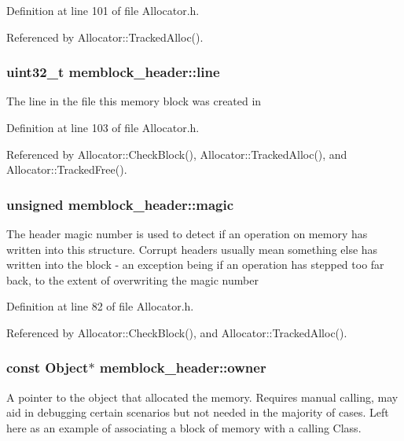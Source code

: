 Definition at line 101 of file Allocator.\-h.



Referenced by Allocator\-::\-Tracked\-Alloc().

\subsubsection[{line}]{\setlength{\rightskip}{0pt plus 5cm}uint32\-\_\-t memblock\-\_\-header\-::line}\label{structmemblock__header_aa2bb67f4837cf735956c591e23e4c800}
The line in the file this memory block was created in 

Definition at line 103 of file Allocator.\-h.



Referenced by Allocator\-::\-Check\-Block(), Allocator\-::\-Tracked\-Alloc(), and Allocator\-::\-Tracked\-Free().

\subsubsection[{magic}]{\setlength{\rightskip}{0pt plus 5cm}unsigned memblock\-\_\-header\-::magic}\label{structmemblock__header_a10ebc950edccb690a784aceb6362d696}
The header magic number is used to detect if an operation on memory has written into this structure. Corrupt headers usually mean something else has written into the block -\/ an exception being if an operation has stepped too far back, to the extent of overwriting the magic number 

Definition at line 82 of file Allocator.\-h.



Referenced by Allocator\-::\-Check\-Block(), and Allocator\-::\-Tracked\-Alloc().

\subsubsection[{owner}]{\setlength{\rightskip}{0pt plus 5cm}const Object$\ast$ memblock\-\_\-header\-::owner}\label{structmemblock__header_a4a1f4790e308d4211fee21b6eceeebc4}
A pointer to the object that allocated the memory. Requires manual calling, may aid in debugging certain scenarios but not needed in the majority of cases. Left here as an example of associating a block of memory with a calling Class. 

